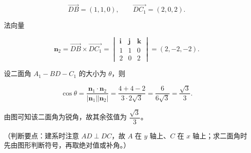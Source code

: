 \begin{answer}
\nopagebreak[4]
\[\overrightarrow{DB}=(1,1,0),\qquad\overrightarrow{DC_1}=(2,0,2).\]

法向量

\nopagebreak[4]
\[\boldsymbol n_2=\overrightarrow{DB}\times\overrightarrow{DC_1}=
\begin{vmatrix}
\boldsymbol i&\boldsymbol j&\boldsymbol k\\
1&1&0\\
2&0&2
\end{vmatrix}=(2,-2,-2).\]

设二面角 $A_1-BD-C_1$ 的大小为 $\theta$，则

\nopagebreak[4]
\[\cos\theta=\frac{\boldsymbol n_1\cdot\boldsymbol n_2}{|\boldsymbol n_1||\boldsymbol n_2|}
=\frac{4+4-2}{3\cdot2\sqrt3}=\frac{6}{6\sqrt3}=\frac{\sqrt3}{3}.\]

由图可知该二面角为锐角，故其余弦值为 $\dfrac{\sqrt3}{3}$。

（判断要点：建系时注意 $AD\perp DC$，故 $A$ 在 $y$ 轴上、$C$ 在 $x$ 轴上；求二面角时先由图形判断符号，再取绝对值或补角。）


\end{answer}
